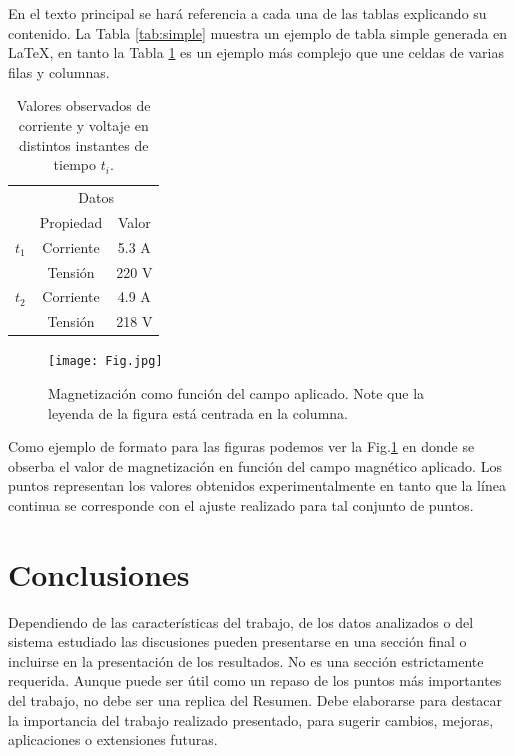 \documentclass[letterpaper, 10 pt, conference]{ieeeconf}  %
\begin{document}
En el texto principal se har\'a referencia a cada una de las tablas explicando su contenido. La Tabla \ref{tab:simple} muestra un ejemplo de tabla simple generada en LaTeX, en tanto la Tabla \ref{tab:compleja} es un ejemplo m\'as complejo que une celdas de varias filas y columnas. 

\begin{table}[!h]
\begin{center}
\begin{tabular}{|l|c|c|}
\cline{2-3}
\multicolumn{1}{c}{}& \multicolumn{2}{|c|}{Datos} \\
\cline{2-3}
\multicolumn{1}{c|}{}& Propiedad & Valor \\
\hline \cline{2-3} {$t_1$} & Corriente  & 5.3 A \\
\cline{2-3}
                      & Tensi\'on    & 220 V\\
\hline \cline{2-3} {$t_2$} & Corriente  & 4.9 A \\ \cline{2-3}
                     & Tensi\'on    & 218 V\\
\hline
 \end{tabular}
 \end{center}
 \caption{Valores observados de corriente y voltaje en distintos instantes de tiempo $t_i$.}
 \label{tab:compleja}
\end{table}


\begin{figure}[htp]
\centering
\texttt{[image: Fig.jpg]}
\caption{Magnetizaci\'on como funci\'on del campo aplicado.
Note que la leyenda de la figura est\'a centrada en la columna. } 
\label{fig:fig}
\end{figure}

Como ejemplo de formato para las figuras podemos ver la Fig.\ref{fig:fig} en donde se obserba el valor de magnetizaci\'on en funci\'on del campo magn\'etico aplicado. Los puntos representan los valores obtenidos experimentalmente en tanto que la l\'inea continua se corresponde con el ajuste realizado para tal conjunto de puntos.  

\section{Conclusiones}

Dependiendo de las caracter\'isticas del trabajo, de los datos analizados o del sistema estudiado las discusiones pueden presentarse en una secci\'on final o incluirse en la presentaci\'on de los resultados. No es una secci\'on estrictamente requerida. Aunque puede ser \'util como un repaso de los puntos m\'as importantes del trabajo, no debe ser una replica del Resumen. Debe elaborarse para destacar la importancia del trabajo realizado presentado, para sugerir cambios, mejoras, aplicaciones o extensiones futuras.
 
\end{document}
